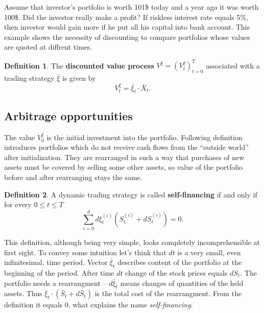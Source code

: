 \documentclass[a4paper,12pt, oneside]{book}
\theoremstyle{definition}
\newtheorem{mydef}{Definition}[section]
\theoremstyle{remark}
\def\Sa{\bar{S}}
\def\Xa{\bar{X}}
\def\xia{\bar{\xi}}
\begin{document}
Assume that investor's portfolio is worth 101\$ today and a year ago it was worth 100\$. Did the investor really make a profit? If riskless interest rate equals 5\%, then investor would gain more if he put all his capital into bank account. This example shows the necessity of discounting to compare portfolios whose values are quoted at diffrent times.
\begin{mydef}
 The \textbf{discounted value process} $V^{\xi} = (V^{\xi}_t)_{t=0}^T$ associated with a trading strategy $\xia$ is given by 
 \begin{equation*}
  V^{\xi}_t = \xia_t \cdot \Xa_t.
 \end{equation*}
\end{mydef}

\subsection{Arbitrage opportunities}
The value $V^{\xi}_0$ is the initial investment into the portfolio. Following definition introduces portfolios which do not receive cash flows from the ``outside world'' after initialization. They are rearranged in such a way that purchases of new assets must be covered by selling some other assets, so value of the portfolio before and after rearranging stays the same.
\begin{mydef}
 A dynamic trading strategy is called \textbf{self-financing} if and only if for every $0 \leq t \leq T$
 \[ \sum\limits_{i=0}^d d\xi^{(i)}_t (S^{(i)}_t + dS^{(i)}_t) = 0. \]
\end{mydef}
This definition, although being very simple, looks completely incomprehensible at first sight. To convey some intuition let's think that $dt$ is a very small, even infinitesimal, time period. Vector $\xia_t$ describes content of the portfolio at the beginning of the period. After time $dt$ change of the stock prices equals $dS_t$. The portfolio needs a rearrangment -- $d\xia_t$ means changes of quantities of the held assets. Thus $\xia_t \cdot (\Sa_t + d\Sa_t)$ is the total cost of the rearrangment. From the definition it equals 0, what explains the name \textit{self-financing}.
\end{document}
